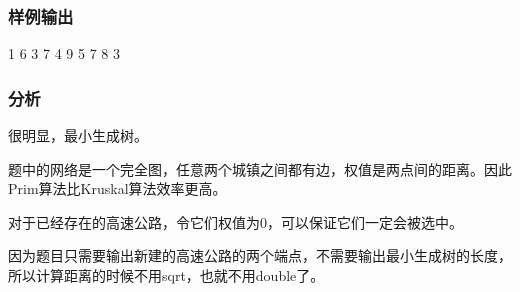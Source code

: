 \subsubsection{样例输出}
\begin{Code}
1 6
3 7
4 9
5 7
8 3
\end{Code}

\subsubsection{分析}
很明显，最小生成树。

题中的网络是一个完全图，任意两个城镇之间都有边，权值是两点间的距离。因此Prim算法比Kruskal算法效率更高。

对于已经存在的高速公路，令它们权值为0，可以保证它们一定会被选中。

因为题目只需要输出新建的高速公路的两个端点，不需要输出最小生成树的长度，所以计算距离的时候不用sqrt，也就不用double了。

